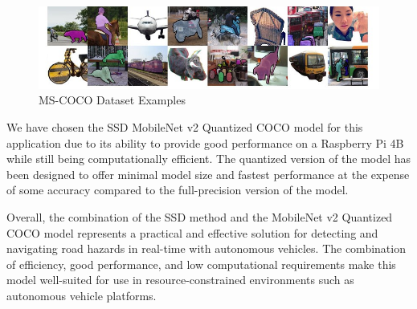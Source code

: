 \begin{figure}[h]
    \centering
    \includegraphics[scale=0.6]{Figures/chapter3/coco-examples.jpg}
    \caption{MS-COCO Dataset Examples}
    \label{fig:coco_eg}
\end{figure}

\noindent
We have chosen the SSD MobileNet v2 Quantized COCO model for this application due to its ability to provide good performance on a Raspberry Pi 4B while still being computationally efficient. The quantized version of the model has been designed to offer minimal model size and fastest performance at the expense of some accuracy compared to the full-precision version of the model.

\noindent
Overall, the combination of the SSD method and the MobileNet v2 Quantized COCO model represents a practical and effective solution for detecting and navigating road hazards in real-time with autonomous vehicles. The combination of efficiency, good performance, and low computational requirements make this model well-suited for use in resource-constrained environments such as autonomous vehicle platforms.

